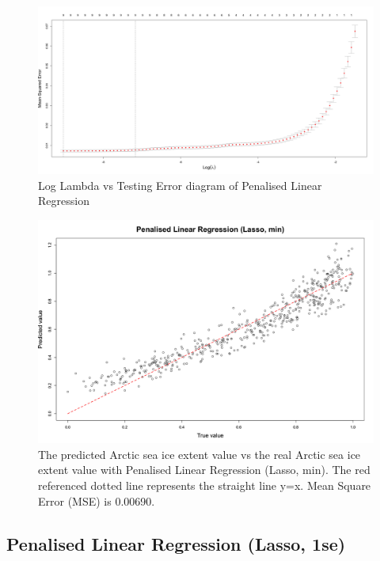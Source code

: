 \begin{figure}[htbp]
\centering
\includegraphics[width = 1.0\textwidth]{Figure/4.2.2-PLR-Log-Lambda-vs-Testing-Error.png}
\caption{Log Lambda vs Testing Error diagram of Penalised Linear Regression}
\label{4.2.2-PLR-Log-Lambda-vs-Testing-Error}
\end{figure}


\begin{figure}[htbp]
\centering
\includegraphics[width = 1.0\textwidth]{Figure/4.2.2-PLR-min.png}
\caption{The predicted Arctic sea ice extent value vs the real Arctic sea ice extent value with Penalised Linear Regression (Lasso, min). The red referenced dotted line represents the straight line y=x. Mean Square Error (MSE) is 0.00690.}
\label{4.2.2-PLR-min}
\end{figure}



\subsection{Penalised Linear Regression (Lasso, 1se)} %

